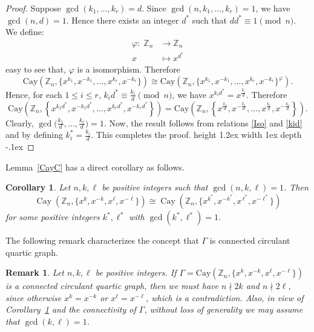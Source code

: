 \documentclass[12pt]{article}
\def\bull{\vrule height 1.2ex width 1ex depth -.1ex }
\newtheorem{cor}[formula]{Corollary}
\newtheorem{rem}[formula]{Remark}
\begin{document}
	\begin{proof}
	Suppose $\gcd(k_1,\dots,k_r) = d$. Since $\gcd(n,k_1,\dots,k_r) = 1$, we have $\gcd(n,d) = 1$.  Hence there exists an integer $d^*$ such that $dd^* \equiv 1 \pmod{n}$. We define:
	\[
	\begin{aligned}
		\varphi :\; \mathbb{Z}_n &\to \mathbb{Z}_n \\
		x &\mapsto x^{ d^*}
	\end{aligned}
	\]
	easy to see that, $\varphi$ is a isomorphism. Therefore
		\begin{equation}\label{Iso}
	\mathrm{Cay}(\mathbb{Z}_n, \{x^{k_1}, x^{-k_1}, \dots, x^{k_r}, x^{-k_r}\})
	\cong
	\mathrm{Cay}(\mathbb{Z}_n, \{x^{k_1}, x^{-k_1}, \dots, x^{k_r}, x^{-k_r}\}^{\varphi}).
	\end{equation}
	Hence, for each  $1 \le i \le r$, $k_i d^* \equiv \frac{k_i}{d} \pmod{n}$, we have $x^{k_i d^*} = x^{\frac{k_i}{d}}$. Therefore
	\begin{equation}\label{kid}	
			\mathrm{Cay}\!\left(\mathbb{Z}_n,
			\left\{x^{k_1 d^{*}},x^{-k_1 d^{*}},\ldots,x^{k_r d^{*}},x^{-k_r d^{*}}\right\}\right)
			=
			\mathrm{Cay}\!\left(\mathbb{Z}_n,
			\left\{x^{\frac{k_1}{d}},x^{-\frac{k_1}{d}},\ldots,x^{\frac{k_r}{d}},x^{-\frac{k_r}{d}}\right\}\right).
			\end{equation}			
 Clearly, $\gcd\Big(\frac{k_1}{d}, \ldots, \frac{k_r}{d}\Big) = 1$. Now, the result follows from relations \eqref{Iso} and \eqref{kid} and by defining $k_i^{*} = \frac{k_i}{d}$. This completes the proof.  \hfill\bull
	\end{proof}
	 Lemma~\ref{CayC} has a direct corollary as follows.
	\begin{cor}\label{four regular}
		Let $n, k,\ell$ be positive integers such that $\gcd(n, k,\ell) = 1$. Then
		\[
		\operatorname{Cay}(\mathbb{Z}_n,\{x^k, x^{-k}, x^{\ell}, x^{-\ell}\})
		\cong
		\operatorname{Cay}(\mathbb{Z}_n,\{x^{k^*}, x^{-k^*}, x^{\,{\ell}^*}, x^{-{\ell}^*}\})
		\]
		for some positive integers $k^*, \ell^*$ with $\gcd(k^*, \ell^*) = 1$.
	\end{cor}
The following remark characterizes  the concept that $\Gamma$ is connected circulant quartic graph.
	\begin{rem}\label{4reco}
	Let $n, k,\ell$ be positive integers. If $\Gamma = \mathrm{Cay}(\mathbb{Z}_n, \{x^k, x^{-k}, x^\ell, x^{-\ell}\})$ is a connected circulant quartic graph, then we must have $n \nmid 2k$ and $n \nmid 2\ell$, since otherwise $x^k = x^{-k}$ or $x^\ell = x^{-\ell}$, which is a contradiction. Also, in view of Corollary~\ref{four regular} and the connectivity of $\Gamma$, without loss of generality we may assume that $\gcd(k,\ell)=1$.	
	\end{rem}
\end{document}
